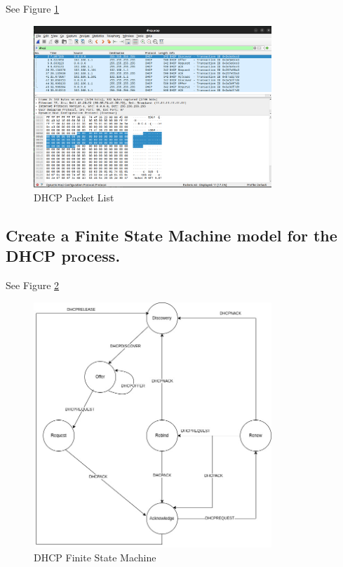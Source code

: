 \documentclass{article}
\begin{document}
See Figure \ref{fig:pcap_dhcp}

\begin{figure}[h]
    \centering
    \includegraphics[width=0.8\textwidth]{task2/dhcp_wireshark.png}
    \caption{DHCP Packet List}
    \label{fig:pcap_dhcp}
\end{figure}

\subsection{Create a Finite State Machine model for the DHCP process.}
 
See Figure \ref{fig:dhcp_fsm}

\begin{figure}[h]
    \centering
    \includegraphics[width=0.8\textwidth]{task2/DHCP_FSM.jpg}
    \caption{DHCP Finite State Machine}
    \label{fig:dhcp_fsm}
\end{figure}
\end{document}

